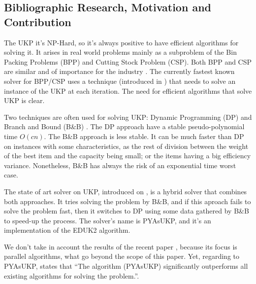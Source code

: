 \documentclass[runningheads,a4paper]{llncs}
\begin{document}
\subsection{Bibliographic Research, Motivation and Contribution}

The UKP it's NP-Hard, so it's always positive to have efficient algorithms for solving it. It arises in real world problems mainly as a subproblem of the Bin Packing Problems (BPP) and Cutting Stock Problem (CSP). Both BPP and CSP are similar and of importance for the industry \cite{CSURVEY} \cite{CGG} \cite{CGG2}. The currently fastest known solver for BPP/CSP\cite{CSURVEY} uses a technique (introduced in \cite{CGG}) that needs to solve an instance of the UKP at each iteration. The need for efficient algorithms that solve UKP is clear.

Two techniques are often used for solving UKP: Dynamic Programming (DP) \cite{CGAR}\cite{CEDUK}\cite{CTCHU} and Branch and Bound (B\&B) \cite{CMTU2}. The DP approach have a stable pseudo-polynomial time \(O(c n)\). The B\&B approach is less stable. It can be much faster than DP on instances with some characteristics, as the rest of division between the weight of the best item and the capacity being small; or the items having a big efficiency variance. Nonetheless, B\&B has always the risk of an exponential time worst case.

The state of art solver on UKP, introduced on \cite{CPYA}, is a hybrid solver that combines both approaches. It tries solving the problem by B\&B, and if this aproach fails to solve the problem fast, then it switches to DP using some data gathered by B\&B to speed-up the process. The solver's name is PYAsUKP, and it's an implementation of the EDUK2 algorithm.%

We don't take in account the results of the recent paper \cite{CMUL}, because its focus is parallel algorithms, what go beyond the scope of this paper. Yet, regarding to PYAsUKP, \cite{CMUL} states that ``The algorithm (PYAsUKP) significantly outperforms all existing algorithms for solving the problem.''.
\end{document}
